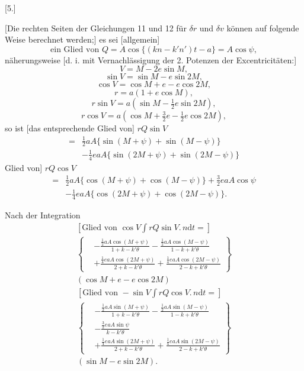 \par\bigskip
\hypertarget{native-392-ceres5}{}
\begin{center}[5.]\end{center}
\noindent\hspace*{\parindent}[Die rechten Seiten der Gleichungen 11 und 12 für \(\delta r\) und \(\delta v\) können auf folgende Weise berechnet werden;] es sei [allgemein]
\[
\text{ein Glied von }Q=A\cos\{(kn-k'n')t-a\}=A\cos\psi,
\]
 näherungsweise [d. i. mit Vernachlässigung der 2. Potenzen der Excentricitäten:]
\[V=M-2e\sin M,\]
\[\sin V=\sin M-e\sin2M,\]
\[\cos V=\cos M+e-e\cos2M,\]
\[r=a(1+e\cos M),\]
\[r\sin V=a(\sin M-\tfrac12e\sin2M),\]
\[r\cos V=a(\cos M+\tfrac32e-\tfrac12e\cos2M),\]
\noindent so ist [das entsprechende \hypertarget{native-393}{}Glied von] \(rQ\sin V\)
\[
\begin{aligned}
={}&\tfrac12aA\{\sin(M+\psi)+\sin(M-\psi)\}\\
&-\tfrac14eaA\{\sin(2M+\psi)+\sin(2M-\psi)\}
\end{aligned}
\]
\noindent Glied von] \(rQ\cos V\)
\[
\begin{aligned}
={}&\tfrac12aA\{\cos(M+\psi)+\cos(M-\psi)\}+\tfrac32eaA\cos\psi\\
&-\tfrac14eaA\{\cos(2M+\psi)+\cos(2M-\psi)\}.
\end{aligned}
\]

Nach der Integration
\[
\begin{gathered}
{}[\text{Glied von }\cos V\int rQ\sin V\mathord{.}\,n\mathrm{d}t=]\\[1ex]
\left\{\begin{aligned}
&-\frac{\tfrac12aA\cos(M+\psi)}{1+k-k'\theta}-\frac{\tfrac12aA\cos(M-\psi)}{1-k+k'\theta}\\
&+\frac{\tfrac14eaA\cos(2M+\psi)}{2+k-k'\theta}+\frac{\tfrac14eaA\cos(2M-\psi)}{2-k+k'\theta}
\end{aligned}\right\}\\[1ex]
(\cos M+e-e\cos2M)
\end{gathered}
\]
\[
\begin{gathered}
{}[\text{Glied von }-\sin V\int rQ\cos V\mathord{.}\,n\mathrm{d}t=]\\[1ex]
\left\{\begin{aligned}
&-\frac{\tfrac12aA\sin(M+\psi)}{1+k-k'\theta}-\frac{\tfrac12aA\sin(M-\psi)}{1-k+k'\theta}\\
&-\frac{\tfrac32eaA\sin\psi}{k-k'\theta}\\
&+\frac{\tfrac14eaA\sin(2M+\psi)}{2+k-k'\theta}+\frac{\tfrac14eaA\sin(2M-\psi)}{2-k+k'\theta}
\end{aligned}\right\}\\[1ex]
(\sin M-e\sin2M).
\end{gathered}
\]


